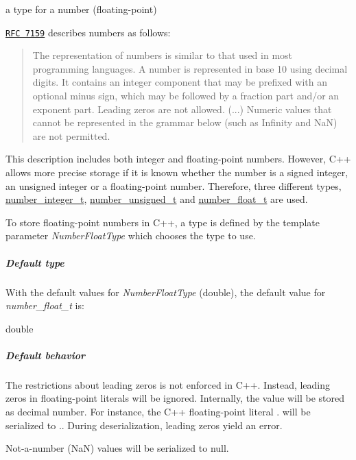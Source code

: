 a type for a number (floating-\/point) 

\href{http://rfc7159.net/rfc7159}{\tt R\+FC 7159} describes numbers as follows\+: \begin{quote}
The representation of numbers is similar to that used in most programming languages. A number is represented in base 10 using decimal digits. It contains an integer component that may be prefixed with an optional minus sign, which may be followed by a fraction part and/or an exponent part. Leading zeros are not allowed. (...) Numeric values that cannot be represented in the grammar below (such as Infinity and NaN) are not permitted. \end{quote}


This description includes both integer and floating-\/point numbers. However, C++ allows more precise storage if it is known whether the number is a signed integer, an unsigned integer or a floating-\/point number. Therefore, three different types, \hyperlink{classnlohmann_1_1basic__json_a98e611d67b7bd75307de99c9358ab2dc}{number\+\_\+integer\+\_\+t}, \hyperlink{classnlohmann_1_1basic__json_ab906e29b5d83ac162e823ada2156b989}{number\+\_\+unsigned\+\_\+t} and \hyperlink{classnlohmann_1_1basic__json_a88d6103cb3620410b35200ee8e313d97}{number\+\_\+float\+\_\+t} are used.

To store floating-\/point numbers in C++, a type is defined by the template parameter {\itshape Number\+Float\+Type} which chooses the type to use.

\subparagraph*{Default type}

With the default values for {\itshape Number\+Float\+Type} ({\ttfamily double}), the default value for {\itshape number\+\_\+float\+\_\+t} is\+:


\begin{DoxyCode}
\textcolor{keywordtype}{double}
\end{DoxyCode}


\subparagraph*{Default behavior}


\begin{DoxyItemize}
\item The restrictions about leading zeros is not enforced in C++. Instead, leading zeros in floating-\/point literals will be ignored. Internally, the value will be stored as decimal number. For instance, the C++ floating-\/point literal {.} will be serialized to {.}. During deserialization, leading zeros yield an error.
\item Not-\/a-\/number (NaN) values will be serialized to {\ttfamily null}.
\end{DoxyItemize}

